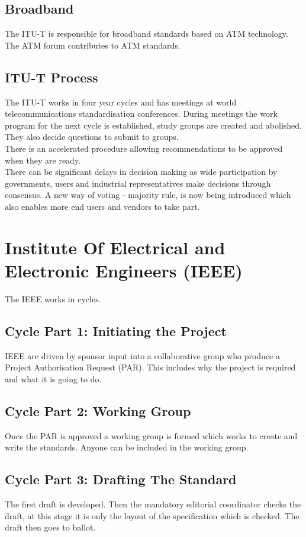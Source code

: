 \subsection{Broadband}
The ITU-T is responsible for broadband standards based on ATM technology. The ATM forum contributes to ATM standards.
\subsection{ITU-T Process}
The ITU-T works in four year cycles and has meetings at world telecommunications standardisation conferences. During meetings the work program for the next cycle is established, study groups are created and abolished. They also decide questions to submit to groups.\\
There is an accelerated procedure allowing recommendations to be approved when they are ready. \\
There can be significant delays in decision making as wide participation by governments, users and industrial representatives make decisions through consensus. A new way of voting - majority rule, is now being introduced which also enables more end users and vendors to take part. 

\section{Institute Of Electrical and Electronic Engineers (IEEE)}
The IEEE works in cycles.
\subsection{Cycle Part 1: Initiating the Project}
IEEE are driven by sponsor input into a collaborative group who produce a Project Authorisation Request (PAR). This includes why the project is required and what it is going to do.
\subsection{Cycle Part 2: Working Group}
Once the PAR is approved a working group is formed which works to create and write the standards. Anyone can be included in the working group.
\subsection{Cycle Part 3: Drafting The Standard}
The first draft is developed. Then the mandatory editorial coordinator checks the draft, at this stage it is only the layout of the specification which is checked. The draft then goes to ballot.
